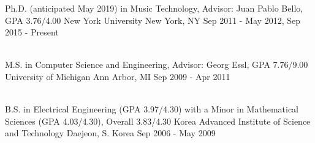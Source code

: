 \documentclass[12pt, a4paper]{awesome-cv}
\newif\iflong
\newcommand{\verbose}[1]{\iflong{#1}\fi}
\newcommand{\concise}[1]{\iflong\else{#1}\fi}
\begin{document}
	\concise{\vspace{-1em}}
	\begin{cventries}
		\cventry
		{Ph.D. (anticipated May 2019) in Music Technology\concise{, Advisor: Juan Pablo Bello, GPA 3.76/4.00}}
		{New York University}
		{New York, NY}
		{Sep 2011 - May 2012, Sep 2015 - Present}
		{
			\verbose{
				\begin{cvitems}
					\item Advised by Dr. Juan Pablo Bello, expected graduation in 2019. GPA 3.76/4.00
					\item The area of research includes music information retrieval, automatic music transcription, and music recommendation.
					\item Relevant coursework: Probabilistic Graphical Models, Statistical Natural Language Processing, Convex Optimization, Deep Learning.
				\end{cvitems}
			}
		}
		\concise{\\[-1em]}
		\cventry
		{M.S. in Computer Science and Engineering\concise{, Advisor: Georg Essl, GPA 7.76/9.00}}
		{University of Michigan}
		{Ann Arbor, MI}
		{Sep 2009 - Apr 2011}
		{
			\verbose{
				\begin{cvitems}
					\item Advised by Dr. Georg Essl, focusing on intelligent systems and interactive music environments. GPA 7.76/9.00
					\item Relevant coursework: Machine Learning, Information Theory, Advanced Compilers, Advanced Computer Network
				\end{cvitems}
			}
		}
		\concise{\\[-1em]}
		\cvwideentry
		{B.S. in Electrical Engineering \concise{(GPA 3.97/4.30)} with a Minor in Mathematical Sciences \concise{(GPA 4.03/4.30), Overall 3.83/4.30}}
		{Korea Advanced Institute of Science and Technology}
		{Daejeon, S. Korea}
		{Sep 2006 - May 2009}
		{
			\verbose{
				\begin{cvitems}
					\item {GPA 3.83/4.30, with 3.97/4.30 in electrical engineering and 4.03/4.30 in mathematical sciences.}
				\end{cvitems}
			}
		}
		\concise{\\[-1em]}
		\verbose{
			\cventry
			{Undergraduate Research Opportunity Program in the Deparment of Mechanical Engineering}
			{Imperial College London}
			{London, UK}
			{Jul 2006}
			{
				\begin{cvitems}
					\item {Developed tools for preprocessing data to be used in finite element method software}
				\end{cvitems}
			}
		}
		\verbose{
			\cvsimpleentry
			{}
			{Korea Science Academy of KAIST}
			{Busan, S. Korea}
			{Mar 2004 - Aug 2006}
		}
	\end{cventries}
\end{document}
